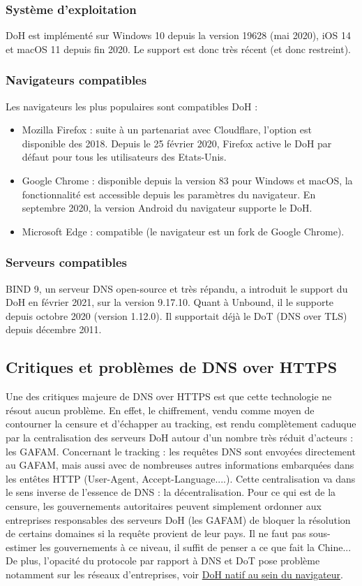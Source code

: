 \documentclass[a4paper,12pt]{article}
\begin{document}
	\subsubsection{Système d'exploitation}
	DoH est implémenté sur Windows 10 depuis la version 19628 (mai 2020), iOS 14 et macOS 11 depuis fin 2020. Le support est donc très récent (et donc restreint).
	\subsubsection{Navigateurs compatibles}
	Les navigateurs les plus populaires sont compatibles DoH :
	\begin{itemize}
		\item Mozilla Firefox : suite à un partenariat avec Cloudflare, l'option est disponible des 2018. Depuis le 25 février 2020, Firefox active le DoH par défaut pour tous les utilisateurs des Etats-Unis.
		\item Google Chrome : disponible depuis la version 83 pour Windows et macOS, la fonctionnalité est accessible depuis les paramètres du navigateur. En septembre 2020, la version Android du navigateur supporte le DoH.
		\item Microsoft Edge : compatible (le navigateur est un fork de Google Chrome).
	\end{itemize}
	\subsubsection{Serveurs compatibles}
	BIND 9, un serveur DNS open-source et très répandu, a introduit le support du DoH en février 2021, sur la version 9.17.10.
	Quant à Unbound, il le supporte depuis octobre 2020 (version 1.12.0). Il supportait déjà le DoT (DNS over TLS) depuis décembre 2011.
	\subsection{Critiques et problèmes de DNS over HTTPS}
	Une des critiques majeure de DNS over HTTPS est que cette technologie ne résout aucun problème.
	En effet, le chiffrement, vendu comme moyen de contourner la censure et d'échapper au tracking, est rendu complètement caduque par la centralisation des serveurs DoH autour d'un nombre très réduit d'acteurs : les GAFAM. Concernant le tracking : les requêtes DNS sont envoyées directement au GAFAM, mais aussi avec de nombreuses autres informations embarquées dans les entêtes HTTP (User-Agent, Accept-Language....). Cette centralisation va dans le sens inverse de l'essence de DNS : la décentralisation. Pour ce qui est de la censure, les gouvernements autoritaires peuvent simplement ordonner aux entreprises responsables des serveurs DoH (les GAFAM) de bloquer la résolution de certains domaines si la requête provient de leur pays. Il ne faut pas sous-estimer les gouvernements à ce niveau, il suffit de penser a ce que fait la Chine... 
	De plus, l'opacité du protocole par rapport à DNS et DoT pose problème notamment sur les réseaux d'entreprises, voir \hyperref[sec:res_etr]{DoH natif au sein du navigateur}.
\end{document}
